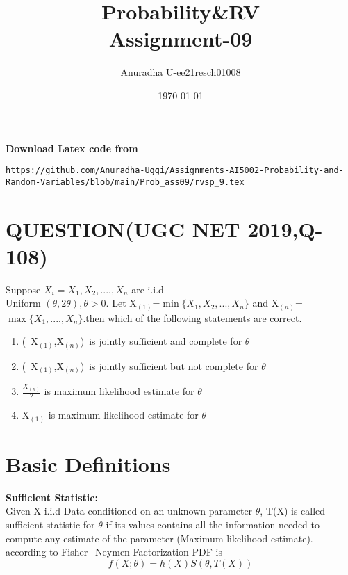 \documentclass[journal,12pt,twocolumn]{IEEEtran}
\title{Probability\&RV \\ Assignment-09}
\author{Anuradha U-ee21resch01008}
\date{\today}
\begin{document}
\maketitle
\newpage
\bigskip
\renewcommand{\thefigure}{\theenumi}
\renewcommand{\thetable}{\theenumi}


\textbf{Download Latex code from}
\begin{lstlisting}
https://github.com/Anuradha-Uggi/Assignments-AI5002-Probability-and-Random-Variables/blob/main/Prob_ass09/rvsp_9.tex
\end{lstlisting}

\section{\textbf{QUESTION(UGC NET 2019,Q-108)}}

Suppose $X_i=X_1,X_2,....,X_n$ are i.i.d \\ Uniform $(\theta,2\theta),\theta> 0$. Let X$_{(1)}$=$\min\{X_1,X_2,...,X_n\}$ and 
X$_{(n)}$=$\max\{X_1,....,X_n\}$.then which of the following statements are correct.\\

\begin{enumerate}
    \item (\ X$_{(1)}$,X$_{(n)}$)\ is jointly sufficient and complete for $\theta$
    \item (\ X$_{(1)}$,X$_{(n)}$)\ is jointly sufficient but not complete for
    $\theta$
    \item $\frac{X_{(n)}}{2}$ is maximum likelihood estimate for $\theta$
    \item X$_{(1)}$ is maximum likelihood estimate for $\theta$
    
\end{enumerate}
\section{\textbf{Basic Definitions}}
\textbf{Sufficient Statistic:}\\

Given X i.i.d Data conditioned on an unknown parameter $\theta$, T(X) is called sufficient statistic for $\theta$ if its values contains all the information needed to compute any estimate of the parameter (Maximum likelihood estimate). according to Fisher$-$Neymen Factorization PDF is \\

\begin{equation}
    f(X;\theta)=h(X)S(\theta,T(X))
\end{equation}
\end{document}
